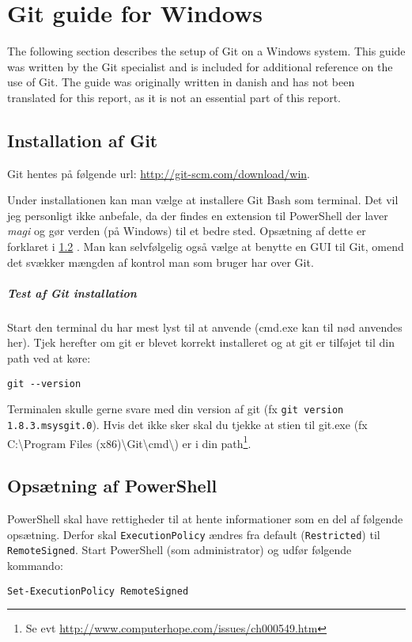 \chapter{Git guide for Windows}
The following section describes the setup of Git on a Windows system.
This guide was written by the Git specialist and is included for additional reference on the use of Git.
The guide was originally written in danish and has not been translated for this report, as it is not an essential part of this report.
\section{Installation af Git}
Git hentes på følgende url: \url{http://git-scm.com/download/win}.

Under installationen kan man vælge at installere Git Bash som terminal.
Det vil jeg personligt ikke anbefale, da der findes en extension til PowerShell der laver \textit{magi} og gør verden (på Windows) til et bedre sted.
Opsætning af dette er forklaret i \ref{gitguide:powershell} .
Man kan selvfølgelig også vælge at benytte en GUI til Git, omend det svækker mængden af kontrol man som bruger har over Git.

\paragraph{Test af Git installation}
Start den terminal du har mest lyst til at anvende (cmd.exe kan til nød anvendes her).
Tjek herefter om git er blevet korrekt installeret og at git er tilføjet til din path ved at køre:
\begin{lstlisting}
git --version
\end{lstlisting}
Terminalen skulle gerne svare med din version af git (fx \texttt{git version 1.8.3.msysgit.0}).
Hvis det ikke sker skal du tjekke at stien til git.exe (fx C:\textbackslash{}Program Files (x86)\textbackslash{}Git\textbackslash{}cmd\textbackslash{}) er i din path\footnote{Se evt \url{http://www.computerhope.com/issues/ch000549.htm}}.

\section{Opsætning af PowerShell}\label{gitguide:powershell}
PowerShell skal have rettigheder til at hente informationer som en del af følgende opsætning.
Derfor skal \texttt{ExecutionPolicy} ændres fra default (\texttt{Restricted}) til \texttt{RemoteSigned}.
Start PowerShell (som administrator) og udfør følgende kommando:
\begin{lstlisting}
Set-ExecutionPolicy RemoteSigned
\end{lstlisting}

